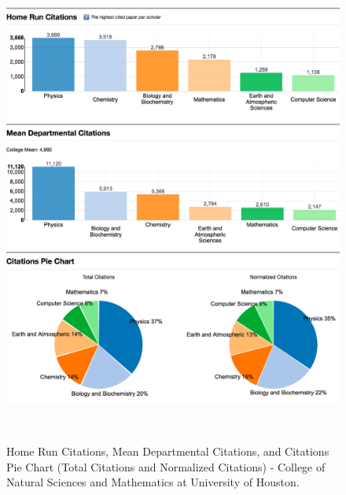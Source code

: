 \begin{figure}
  \centering
  \includegraphics[width=1\textwidth]{figures/Coll-Cit-HD}
  \includegraphics[width=1\textwidth]{figures/Coll-Cit-HD2}
  \includegraphics[width=1\textwidth]{figures/Coll-Cit-HD3}
  \caption{Home Run Citations, Mean Departmental Citations, and Citations Pie Chart (Total Citations and Normalized Citations) - College of Natural Sciences and Mathematics at University of Houston.}~\label{fig:DP-College1}
\end{figure}

